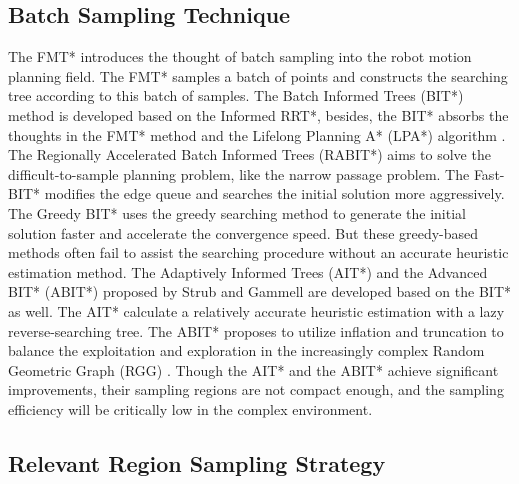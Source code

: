 \subsection{Batch Sampling Technique}

The FMT* \cite{janson2015fast} introduces the thought of batch sampling into the robot motion planning field.
The FMT* samples a batch of points and constructs the searching tree according to this batch of samples.
The Batch Informed Trees (BIT*) \cite{gammell2015batch, gammell2020batch} method is developed based on the Informed RRT*, besides, the BIT* absorbs the thoughts in the FMT* method \cite{janson2015fast} and the Lifelong Planning A* (LPA*) algorithm \cite{koenig2004lifelong}.
The Regionally Accelerated Batch Informed Trees (RABIT*) \cite{choudhury2016regionally} aims to solve the difficult-to-sample planning problem, like the narrow passage problem.
The Fast-BIT* \cite{holston2017fast} modifies the edge queue and searches the initial solution more aggressively. 
The Greedy BIT* \cite{chen2021greedy} uses the greedy searching method to generate the initial solution faster and accelerate the convergence speed.
But these greedy-based methods often fail to assist the searching procedure without an accurate heuristic estimation method. 
The Adaptively Informed Trees (AIT*) \cite{strub2020adaptively} and the Advanced BIT* (ABIT*) \cite{strub2020advanced} proposed by Strub and Gammell are developed based on the BIT* as well. 
The AIT* calculate a relatively accurate heuristic estimation with a lazy reverse-searching tree.
The ABIT* proposes to utilize inflation and truncation to balance the exploitation and exploration in the increasingly complex Random Geometric Graph (RGG) \cite{penrose2003random}.
Though the AIT* and the ABIT* achieve significant improvements, their sampling regions are not compact enough, and the sampling efficiency will be critically low in the complex environment.


\subsection{Relevant Region Sampling Strategy}

